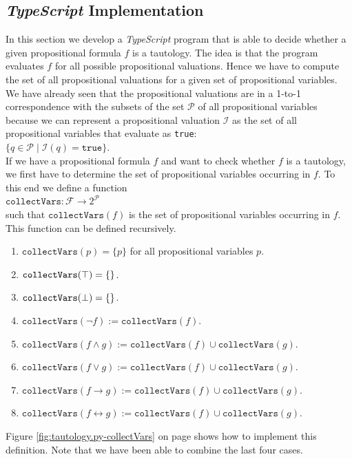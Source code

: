 \subsection{\textsl{TypeScript} Implementation}
In this section we develop a \textsl{TypeScript} program that is able to decide whether a given propositional
formula $f$ is a tautology.  The idea is that the program evaluates $f$ for all possible propositional
valuations.  Hence we have to compute the set of all propositional valuations for a given set of
propositional variables.  We have already seen that the propositional valuations are in a 1-to-1
correspondence with the subsets of the set $\mathcal{P}$ of all propositional variables because we can
represent a propositional valuation $\mathcal{I}$ as the set of all propositional variables that evaluate
as \texttt{true}:
\\[0.2cm]
\hspace*{1.3cm}
$\bigl\{ q \in \mathcal{P} \mid \mathcal{I}(q) = \mathtt{true} \bigr\}$.
\\[0.2cm]
If we have a propositional formula $f$ and want to check whether $f$ is a tautology, we first have to determine
the set of propositional variables occurring in $f$.
To this end we define a function
\\[0.2cm]
\hspace*{1.3cm}
$\texttt{collectVars}: \mathcal{F} \rightarrow 2^{\mathcal{P}}$
\\[0.2cm]
such that $\mathtt{collectVars}(f)$ is the set of propositional variables occurring in $f$.  This function can
be defined recursively.
\begin{enumerate}
\item $\mathtt{collectVars}(p) = \{ p \}$ \quad for all propositional variables $p$.
\item $\mathtt{collectVars}(\top) = \{\}$.
\item $\mathtt{collectVars}(\bot) = \{\}$.
\item $\mathtt{collectVars}(\neg f) := \mathtt{collectVars}(f)$.
\item $\mathtt{collectVars}(f \wedge g) := \mathtt{collectVars}(f) \cup \mathtt{collectVars}(g)$.
\item $\mathtt{collectVars}(f \vee g) := \mathtt{collectVars}(f) \cup \mathtt{collectVars}(g)$.
\item $\mathtt{collectVars}(f \rightarrow g) := \mathtt{collectVars}(f) \cup \mathtt{collectVars}(g)$.
\item $\mathtt{collectVars}(f \leftrightarrow g) := \mathtt{collectVars}(f) \cup \mathtt{collectVars}(g)$.
\end{enumerate}
Figure \ref{fig:tautology.py-collectVars} on page \pageref{fig:tautology.py-collectVars} shows how to implement
this definition.  Note that we have been able to combine the last four cases.

